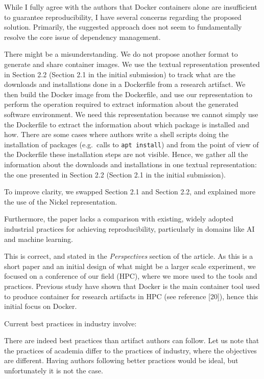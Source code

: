 \documentclass[%
	11pt,
	final,
]{article}
\makeatletter
\newcommand{\eg}{e.g.\@}
\makeatother
\begin{document}
While I fully agree with the authors that Docker containers alone are insufficient to guarantee reproducibility, I have several concerns regarding the proposed solution.
Primarily, the suggested approach does not seem to fundamentally resolve the core issue of dependency management.
\begin{review-answer}
  There might be a misunderstanding.
  We do not propose another format to generate and share container images.
  We use the textual representation presented in Section 2.2 (Section 2.1 in the initial submission) to track what are the downloads and installations done in a Dockerfile from a research artifact.
  We then build the Docker image from the Dockerfile, and use our representation to perform the operation required to extract information about the generated software environment.
  We need this representation because we cannot simply use the Dockerfile to extract the information about which package is installed and how.
  There are some cases where authors write a shell scripts doing the installation of packages (\eg\ calls to \texttt{apt install}) and from the point of view of the Dockerfile these installation steps are not visible.
  Hence, we gather all the information about the downloads and installations in one textual representation: the one presented in Section 2.2 (Section 2.1 in the initial submission).


  To improve clarity, we swapped Section 2.1 and Section 2.2, and explained more the use of the Nickel representation.
\end{review-answer}
Furthermore, the paper lacks a comparison with existing, widely adopted industrial practices for achieving reproducibility, particularly in domains like AI and machine learning.
\begin{review-answer}
  This is correct, and stated in the \emph{Perspectives} section of the article.
  As this is a short paper and an initial design of what might be a larger scale experiment, we focused on a conference of our field (HPC), where we more used to the tools and practices.
  Previous study have shown that Docker is the main container tool used to produce container for research artifacts in HPC (see reference [20]), hence this initial focus on Docker.
\end{review-answer}

Current best practices in industry involve:

\begin{review-answer}
  There are indeed best practices than artifact authors can follow.
  Let us note that the practices of academia differ to the practices of industry, where the objectives are different.
  Having authors following better practices would be ideal, but unfortunately it is not the case.
\end{review-answer}
\end{document}
